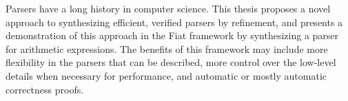 % 
% 
%
Parsers have a long history in computer science.  This thesis proposes a novel approach to synthesizing efficient, verified parsers by refinement, and presents a demonstration of this approach in the Fiat framework by synthesizing a parser for arithmetic expressions.  The benefits of this framework may include more flexibility in the parsers that can be described, more control over the low-level details when necessary for performance, and automatic or mostly automatic correctness proofs.
